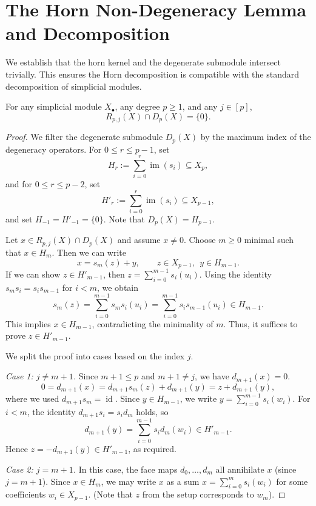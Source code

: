 \section{The Horn Non-Degeneracy Lemma and Decomposition}
\label{sec:hornnondegeneracylemma}

We establish that the horn kernel and the degenerate submodule intersect trivially. This ensures the Horn decomposition is compatible with the standard decomposition of simplicial modules.

\begin{lemma}\label{lem:horn-nondeg}
For any simplicial module $X_\bullet$, any degree $p\ge1$, and any $j\in[p]$,
\[
R_{p,j}(X)\cap D_p(X)=\{0\}.
\]
\end{lemma}

\begin{proof}
We filter the degenerate submodule $D_p(X)$ by the maximum index of the degeneracy operators. For $0\le r\le p-1$, set
\[
H_r:=\sum_{i=0}^{r}\operatorname{im}(s_i)\subseteq X_p,
\]
and for $0\le r\le p-2$, set
\[
H'_r:=\sum_{i=0}^{r}\operatorname{im}(s_i)\subseteq X_{p-1},
\]
and set $H_{-1}=H'_{-1}=\{0\}$. Note that $D_p(X)=H_{p-1}$.

Let $x\in R_{p,j}(X)\cap D_p(X)$ and assume $x\neq 0$. Choose $m\ge0$ minimal such that $x\in H_m$. Then we can write
\[
x=s_m(z)+y,\qquad z\in X_{p-1},\ \ y\in H_{m-1}.
\]
If we can show $z\in H'_{m-1}$, then $z=\sum_{i=0}^{m-1}s_i(u_i)$. Using the identity $s_m s_i=s_i s_{m-1}$ for $i<m$, we obtain
\[
s_m(z)=\sum_{i=0}^{m-1}s_m s_i(u_i)=\sum_{i=0}^{m-1}s_i s_{m-1}(u_i)\in H_{m-1}.
\]
This implies $x\in H_{m-1}$, contradicting the minimality of $m$. Thus, it suffices to prove $z\in H'_{m-1}$.

We split the proof into cases based on the index $j$.

\emph{Case 1: $j\neq m+1$.}
Since $m+1\le p$ and $m+1\neq j$, we have $d_{m+1}(x)=0$.
\[
0 = d_{m+1}(x) = d_{m+1}s_m(z) + d_{m+1}(y) = z + d_{m+1}(y),
\]
where we used $d_{m+1}s_m = \operatorname{id}$. Since $y \in H_{m-1}$, we write $y=\sum_{i=0}^{m-1} s_i(w_i)$. For $i<m$, the identity $d_{m+1}s_i = s_i d_m$ holds, so
\[
d_{m+1}(y) = \sum_{i=0}^{m-1} s_i d_m(w_i) \in H'_{m-1}.
\]
Hence $z = -d_{m+1}(y) \in H'_{m-1}$, as required.

\emph{Case 2: $j = m+1$.}
In this case, the face maps $d_0, \dots, d_m$ all annihilate $x$ (since $j=m+1$). Since $x \in H_m$, we may write $x$ as a sum $x = \sum_{i=0}^m s_i(w_i)$ for some coefficients $w_i \in X_{p-1}$. (Note that $z$ from the setup corresponds to $w_m$).


\end{proof}
